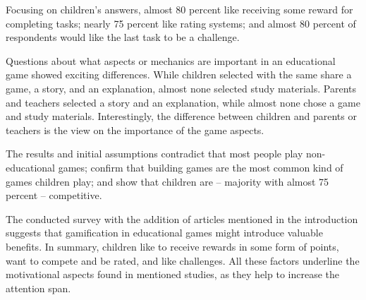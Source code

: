 Focusing on children's answers, almost 80 percent like receiving some reward for completing tasks; nearly 75 percent like rating systems; and almost 80 percent of respondents would like the last task to be a challenge.

Questions about what aspects or mechanics are important in an educational game showed exciting differences.
While children selected with the same share a game, a story, and an explanation, almost none selected study materials.
Parents and teachers selected a story and an explanation, while almost none chose a game and study materials.
Interestingly, the difference between children and parents or teachers is the view on the importance of the game aspects.

The results and initial assumptions contradict that most people play non-educational games; confirm that building games are the most common kind of games children play; and show that children are -- majority with almost 75 percent -- competitive. 

The conducted survey with the addition of articles mentioned in the introduction suggests that gamification in educational games might introduce valuable benefits.
In summary, children like to receive rewards in some form of points, want to compete and be rated, and like challenges.
All these factors underline the motivational aspects found in mentioned studies,
as they help to increase the attention span.
